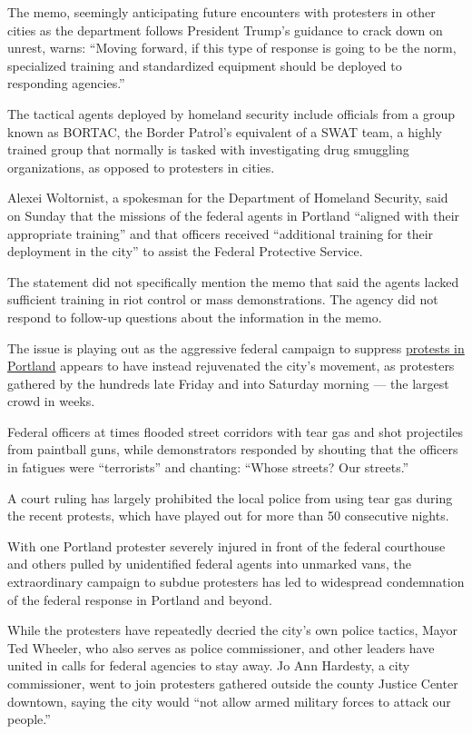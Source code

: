 The memo, seemingly anticipating future encounters with protesters in
other cities as the department follows President Trump's guidance to
crack down on unrest, warns: ``Moving forward, if this type of response
is going to be the norm, specialized training and standardized equipment
should be deployed to responding agencies.''

The tactical agents deployed by homeland security include officials from
a group known as BORTAC, the Border Patrol's equivalent of a SWAT team,
a highly trained group that normally is tasked with investigating drug
smuggling organizations, as opposed to protesters in cities.

Alexei Woltornist, a spokesman for the Department of Homeland Security,
said on Sunday that the missions of the federal agents in Portland
``aligned with their appropriate training'' and that officers received
``additional training for their deployment in the city'' to assist the
Federal Protective Service.

The statement did not specifically mention the memo that said the agents
lacked sufficient training in riot control or mass demonstrations. The
agency did not respond to follow-up questions about the information in
the memo.

The issue is playing out as the aggressive federal campaign to suppress
\href{https://www.nytimes3xbfgragh.onion/2020/07/20/us/portland-protests-navy-christopher-david.html}{protests
in Portland} appears to have instead rejuvenated the city's movement, as
protesters gathered by the hundreds late Friday and into Saturday
morning --- the largest crowd in weeks.

Federal officers at times flooded street corridors with tear gas and
shot projectiles from paintball guns, while demonstrators responded by
shouting that the officers in fatigues were ``terrorists'' and chanting:
``Whose streets? Our streets.''

A court ruling has largely prohibited the local police from using tear
gas during the recent protests, which have played out for more than 50
consecutive nights.

With one Portland protester severely injured in front of the federal
courthouse and others pulled by unidentified federal agents into
unmarked vans, the extraordinary campaign to subdue protesters has led
to widespread condemnation of the federal response in Portland and
beyond.

While the protesters have repeatedly decried the city's own police
tactics, Mayor Ted Wheeler, who also serves as police commissioner, and
other leaders have united in calls for federal agencies to stay away. Jo
Ann Hardesty, a city commissioner, went to join protesters gathered
outside the county Justice Center downtown, saying the city would ``not
allow armed military forces to attack our people.''


